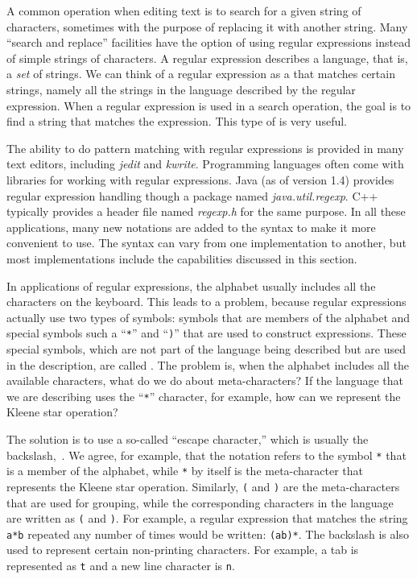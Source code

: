 A common operation when editing text is to search for a
given string of characters, sometimes with the purpose of
replacing it with another string.  Many ``search and replace'' facilities have the option of using regular expressions
instead of simple strings of characters.  A regular expression describes
a language, that is, a \textit{set} of strings.  We can think of a regular
expression as a  that matches certain strings, namely all
the strings in the language described by the regular expression.
When a regular expression is used in a search operation, the
goal is to find a string that matches the expression.  This type
of  is very useful.

The ability to do pattern matching with regular expressions is provided
in many text editors, including \textit{jedit} and \textit{kwrite}.
Programming languages often come with libraries for working with
regular expressions.  Java (as of version 1.4) provides regular
expression handling though a package named \textit{java.util.regexp}.
C++ typically provides a header file named \textit{regexp.h} for
the same purpose.  In all these applications, many new notations are added to the syntax to make it
more convenient to use.  The syntax can vary from one implementation
to another, but most implementations include the capabilities
discussed in this section.

\medskip

In applications of regular expressions, the alphabet usually includes
all the characters on the keyboard.  This leads to a problem, because
regular expressions actually use two types of symbols:  symbols that
are members of the alphabet and special symbols such a ``\texttt{*}'' and ``\texttt{)}'' that
are used to construct expressions.  These special symbols, which
are not part of the language being described but are used in the
description, are called .  The problem is,
when the alphabet includes all the available characters, what do we
do about meta-characters?  If the language that we are describing 
uses the ``\texttt{*}'' character, for example, how can we represent the
Kleene star operation?

The solution is to use a so-called ``escape character,'' which is
usually the backslash,~\texttt{\bk}.  We agree, for example, that the notation
\texttt{\bk*} refers to the symbol \texttt{*} that is a member of
the alphabet, while \texttt{*} by itself is the meta-character
that represents the Kleene star operation.  Similarly,
\texttt{(} and \texttt{)} are the meta-characters that are used
for grouping, while the corresponding characters in the language
are written as \texttt{\bk(} and \texttt{\bk)}.  For example,
a regular expression that matches the string \texttt{a*b} repeated
any number of times would be written: \texttt{(a\bk*b)*}.
The backslash is also used to represent certain non-printing
characters.  For example, a tab is represented as \texttt{\bk t}
and a new line character is \texttt{\bk n}.


